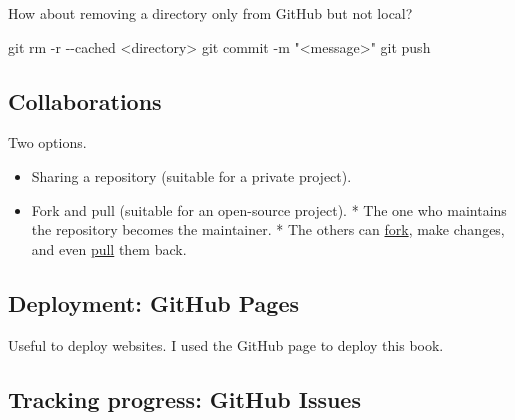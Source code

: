 \documentclass[
  letterpaper,
  DIV=11,
  numbers=noendperiod]{scrreprt}
\newenvironment{Shaded}{\begin{snugshade}}{\end{snugshade}}
\newcommand{\AttributeTok}[1]{\textcolor[rgb]{0.40,0.45,0.13}{#1}}
\newcommand{\FunctionTok}[1]{\textcolor[rgb]{0.28,0.35,0.67}{#1}}
\newcommand{\NormalTok}[1]{\textcolor[rgb]{0.00,0.23,0.31}{#1}}
\newcommand{\OperatorTok}[1]{\textcolor[rgb]{0.37,0.37,0.37}{#1}}
\newcommand{\StringTok}[1]{\textcolor[rgb]{0.13,0.47,0.30}{#1}}
\providecommand{\tightlist}{%
  \setlength{\itemsep}{0pt}\setlength{\parskip}{0pt}}\usepackage{longtable,booktabs,array}
\begin{document}
How about removing a directory only from GitHub but not local?

\begin{Shaded}
\begin{Highlighting}[]
\FunctionTok{git}\NormalTok{ rm }\AttributeTok{{-}r} \AttributeTok{{-}{-}cached} \OperatorTok{\textless{}}\NormalTok{directory}\OperatorTok{\textgreater{}}
\FunctionTok{git}\NormalTok{ commit }\AttributeTok{{-}m} \StringTok{"\textless{}message\textgreater{}"}
\FunctionTok{git}\NormalTok{ push}
\end{Highlighting}
\end{Shaded}

\hypertarget{collaborations}{%
\subsection*{Collaborations}\label{collaborations}}

Two options.

\begin{itemize}
\tightlist
\item
  Sharing a repository (suitable for a private project).
\item
  Fork and pull (suitable for an open-source project). \hspace{0pt} *
  The one who maintains the repository becomes the maintainer.
  \hspace{0pt} * The others can
  \href{https://help.GitHub.com/articles/about-forks/}{fork}, make
  changes, and even
  \href{https://help.GitHub.com/articles/about-pull-requests/}{pull}
  them back.
\end{itemize}

\hypertarget{deployment-github-pages}{%
\subsection*{Deployment: GitHub Pages}\label{deployment-github-pages}}

Useful to deploy websites. I used the GitHub page to deploy this book.

\hypertarget{tracking-progress-github-issues}{%
\subsection*{Tracking progress: GitHub
Issues}\label{tracking-progress-github-issues}}
\end{document}

